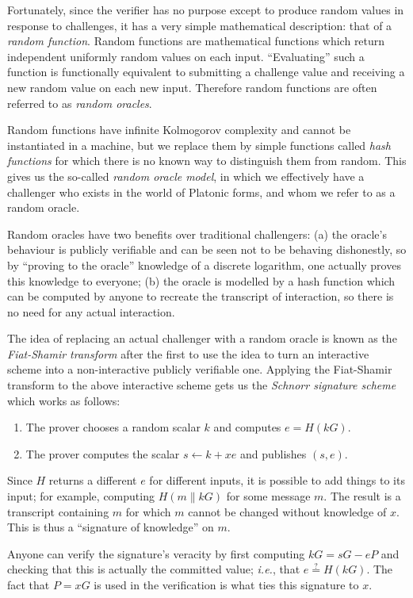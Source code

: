 \documentclass[letterpaper]{article}
\begin{document}
Fortunately, since the verifier has no purpose except to produce random values
in response to challenges, it has a very simple mathematical description: that
of a \emph{random function}. Random functions are mathematical functions which
return independent uniformly random values on each input. ``Evaluating''
such a function is functionally equivalent to submitting a challenge value
and receiving a new random value on each new input. Therefore random functions
are often referred to as \emph{random oracles}.

Random functions have infinite Kolmogorov complexity and cannot be instantiated
in a machine, but we replace them by simple functions called \emph{hash functions}
for which there is no known way to distinguish them from random.
This gives us the so-called \emph{random oracle model}\cite{bellare+rogaway1993},
in which we effectively have a challenger who exists in the world of Platonic
forms\cite{ross1951}, and whom we refer to as a random oracle.

Random oracles have two benefits over traditional challengers: (a) the oracle's
behaviour is publicly verifiable and can be seen not to be behaving dishonestly,
so by ``proving to the oracle'' knowledge of a discrete logarithm, one actually
proves this knowledge to everyone; (b) the oracle is modelled by a hash function
which can be computed by anyone to recreate the transcript of interaction, so
there is no need for any actual interaction.

The idea of replacing an actual challenger with a random oracle is known as the
\emph{Fiat-Shamir transform}\cite{fiat+shamir1986} after the first to use the idea to
turn an interactive scheme into a non-interactive publicly verifiable one.
Applying the Fiat-Shamir transform to the above interactive scheme gets us
the \emph{Schnorr signature scheme} which works as follows:
\begin{enumerate}
\item The prover chooses a random scalar $k$ and computes $e = H(kG)$.
\item The prover computes the scalar $s\gets k + xe$ and publishes $(s, e)$.
\end{enumerate}
Since $H$ returns a different $e$ for different inputs, it is possible to add
things to its input; for example, computing $H(m\|kG)$ for some message $m$.
The result is a transcript containing $m$ for which $m$ cannot be changed
without knowledge of $x$. This is thus a ``signature of knowledge'' on $m$.

Anyone can verify the signature's veracity by first computing $kG = sG - eP$
and checking that this is actually the committed value; \emph{i.e.}, that
$e\stackrel{?}{=}H(kG)$.
The fact that $P=xG$ is used in the verification is what ties this signature
to $x$.
\end{document}
